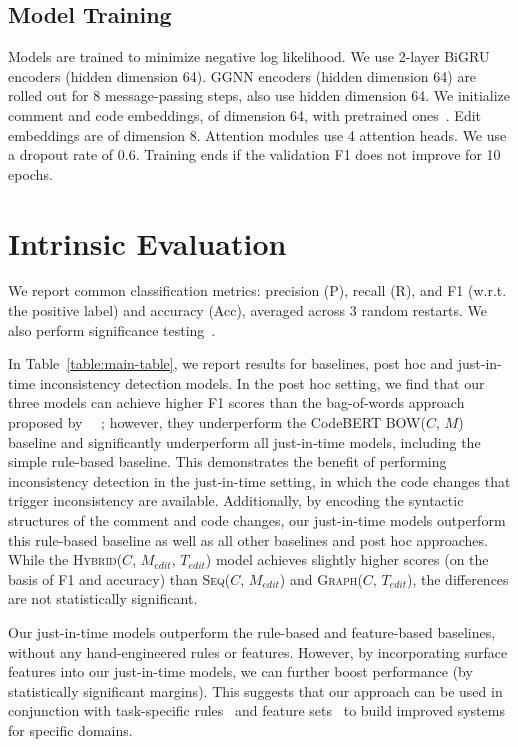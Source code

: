 \documentclass[letterpaper]{article} %
\newcommand{\Comment}{$C$}
\newcommand{\NewCode}{$M$}
\newcommand{\Posthoc}{post hoc}
\newcommand{\JustInTime}{just-in-time}
\newcommand{\EditCode}{$M_{edit}$}
\newcommand{\EditTree}{$T_{edit}$}
\newcommand{\SeqModel}{\textsc{Seq}}
\newcommand{\GraphModel}{\textsc{Graph}}
\newcommand{\HybridModel}{\textsc{Hybrid}}
\newcommand{\JustInTimeSeq}{\SeqModel{}(\Comment{}, \EditCode{})}
\newcommand{\JustInTimeGraph}{\GraphModel{}(\Comment{}, \EditTree{})}
\newcommand{\JustInTimeHybrid}{\HybridModel{}(\Comment{}, \EditCode{}, \EditTree{})}
\newcommand{\Bert}{CodeBERT BOW}
\newcommand{\PosthocBert}{\Bert{}(\Comment{}, \NewCode{})}
\begin{document}
\subsection{Model Training}
Models are trained to minimize negative log likelihood. We use 2-layer BiGRU encoders (hidden dimension 64). GGNN encoders (hidden dimension 64) are rolled out for 8 message-passing steps, also use hidden dimension 64. We initialize comment and code embeddings, of dimension 64, with pretrained ones~\cite{panthaplackel2020update}. Edit embeddings are of dimension 8. Attention modules use 4 attention heads. We use a dropout rate of 0.6. Training ends if the validation F1 does not improve for 10 epochs.


\section{Intrinsic Evaluation}
We report common classification metrics: precision (P), recall (R), and F1 (w.r.t. the positive label) and accuracy (Acc), averaged across 3 random restarts. We also perform significance testing~\cite{berg-kirkpatrick-etal-2012-empirical}.

In Table~\ref{table:main-table}, we report results for baselines, \Posthoc{} and \JustInTime{} inconsistency detection models. In the \Posthoc{} setting, we find that our three models can achieve higher F1 scores than the bag-of-words approach proposed by ~\citeauthor{Corazza18}~; however, they underperform the \PosthocBert{} baseline and significantly underperform all \JustInTime{} models, including the simple rule-based baseline. This demonstrates the benefit of performing inconsistency detection in the \JustInTime{} setting, in which the code changes that trigger inconsistency are available. Additionally, by encoding the syntactic structures of the comment and code changes, our \JustInTime{} models outperform this rule-based baseline as well as all other baselines and \Posthoc{} approaches. While the \JustInTimeHybrid{} model achieves slightly higher scores (on the basis of F1 and accuracy) than \JustInTimeSeq{} and \JustInTimeGraph{}, the differences are not statistically significant.

Our \JustInTime{} models outperform the rule-based and feature-based baselines, without any hand-engineered rules or features. However, by incorporating surface features into our \JustInTime{} models, we can further boost performance (by statistically significant margins). This suggests that our approach can be used in conjunction with task-specific rules~\cite{icomment2007,aComment,tComment,ratol2017fragile} and feature sets~\cite{LiuOutdatedLine} to build improved systems for specific domains.
\end{document}
